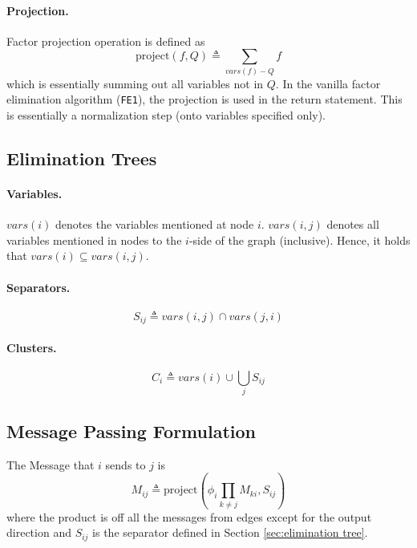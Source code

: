 \documentclass[11pt]{article}
\begin{document}
\paragraph{Projection.} Factor projection operation is defined as 
\begin{equation}
	\mathrm {project} (f, Q) \triangleq \sum_{vars(f) - Q} f
\end{equation}
which is essentially summing out all variables not in $Q$. In the vanilla factor elimination algorithm (\texttt{FE1}), the projection is used in the return statement. This is essentially a normalization step (onto variables specified only).

\subsection{Elimination Trees\label{sec:elimination tree}}
\paragraph{Variables.}
$vars(i)$ denotes the variables mentioned at node $i$. $vars(i, j)$ denotes all variables mentioned in nodes to the $i$-side of the graph (inclusive). Hence, it holds that $vars(i) \subseteq vars(i, j)$.

\paragraph{Separators.} 
\begin{equation}
	S_{ij} \triangleq vars(i, j) \cap vars(j, i)
\end{equation}

\paragraph{Clusters.} 
\begin{equation}
	C_i \triangleq vars(i) \cup \bigcup_j S_{ij}
\end{equation}

\subsection{Message Passing Formulation}
The Message that $i$ sends to $j$ is 
\begin{equation}
	M_{ij} \triangleq \mathrm{project} \left( \phi_i \prod_{k \neq j } M_{ki}, S_{ij} \right) 
\end{equation}
where the product is off all the messages from edges except for the output direction and $S_{ij}$ is the separator defined in Section \ref{sec:elimination tree}.
\end{document}
